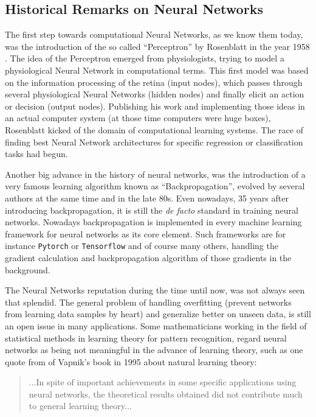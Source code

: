 
\subsection{Historical Remarks on Neural Networks}\label{sec:prev_nn_history}
The first step towards computational Neural Networks, as we know them today, was the introduction of the so called \enquote{Perceptron} by Rosenblatt in the year 1958 \cite{Rosenblatt1958}. 
The idea of the Perceptron emerged from physiologists, trying to model a physiological Neural Network in computational terms. 
This first model was based on the information processing of the retina (input nodes), which passes through several physiological Neural Networks (hidden nodes) and finally elicit an action or decision (output nodes).
Publishing his work and implementing those ideas in an actual computer system (at those time computers were huge boxes), Rosenblatt kicked of the domain of computational learning systems.
The race of finding best Neural Network architectures for specific regression or classification tasks had begun.

Another big advance in the history of neural networks, was the introduction of a very famous learning algorithm known as \enquote{Backpropagation}, evolved by several authors at the same time \cite{LeCun1986} and \cite{Rumelhart1986} in the late 80s. 
Even nowadays, 35 years after introducing backpropagation, it is still the \emph{de facto} standard in training neural networks.
Nowadays backpropagation is implemented in every machine learning framework for neural networks as its core element.
Such frameworks are for instance \texttt{Pytorch} or \texttt{Tensorflow} and of course many others, handling the gradient calculation and backpropagation algorithm of those gradients in the background.

The Neural Networks reputation during the time until now, was not always seen that splendid.
The general problem of handling overfitting (prevent networks from learning data samples by heart) and generalize better on unseen data, is still an open issue in many applications.
Some mathematicians working in the field of statistical methods in learning theory for pattern recognition, regard neural networks as being not meaningful in the advance of learning theory, such as one quote from \cite{Vapnik1995} of Vapnik's book in 1995 about natural learning theory:

\begin{quote}
...In spite of important achievements in some specific applications using neural networks, the theoretical results obtained did not contribute much to general learning theory...
\end{quote}

